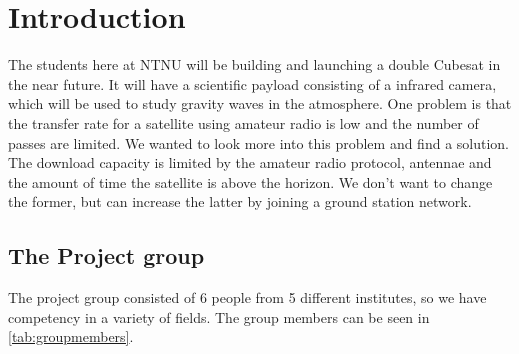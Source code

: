 \chapter{Introduction}
\label{chap:introduction}

The students here at NTNU will be building and launching a double Cubesat in the near future. It will have a scientific payload consisting of a infrared camera, which will be used to study gravity waves in the atmosphere. One problem is that the transfer rate for a satellite using amateur radio is low and the number of passes are limited. We wanted to look more into this problem and find a solution. The download capacity is limited by the amateur radio protocol, antennae and the amount of time the satellite is above the horizon. We don't want to change the former, but can increase the latter by joining a ground station network.




\section{The Project group}
The project group consisted of 6 people from 5 different institutes, so we have competency in a variety of fields. The group members can be seen in \autoref{tab:groupmembers}.

